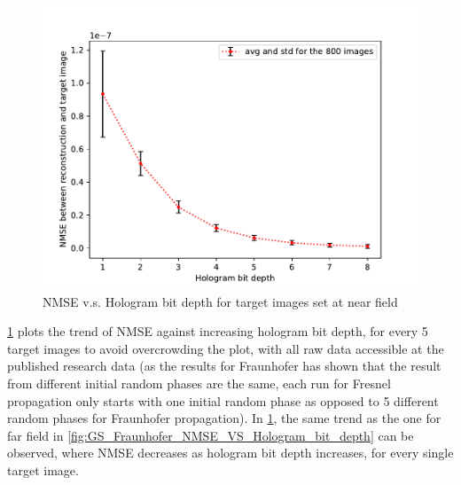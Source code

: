 	\begin{figure} [H]
	   \begin{center}
	   \includegraphics[width = \textwidth]{GS_Fraunhofer_NMSE_VS_Hologram bit depth.pdf}
	   \end{center}
	   \caption{\label{fig:GS_Fresnel0.1_NMSE_VS_Hologram_bit_depth} NMSE v.s. Hologram bit depth for target images set at near field}
	\end{figure}

	\cref{fig:GS_Fresnel0.1_NMSE_VS_Hologram_bit_depth} plots the trend of NMSE against increasing hologram bit depth, for every 5 target images to avoid overcrowding the plot, with all raw data accessible at the published research data \cite{research_data_Sha2024} (as the results for Fraunhofer has shown that the result from different initial random phases are the same, each run for Fresnel propagation only starts with one initial random phase as opposed to 5 different random phases for Fraunhofer propagation). In \cref{fig:GS_Fresnel0.1_NMSE_VS_Hologram_bit_depth}, the same trend as the one for far field in \cref{fig:GS_Fraunhofer_NMSE_VS_Hologram_bit_depth} can be observed, where NMSE decreases as hologram bit depth increases, for every single target image.


